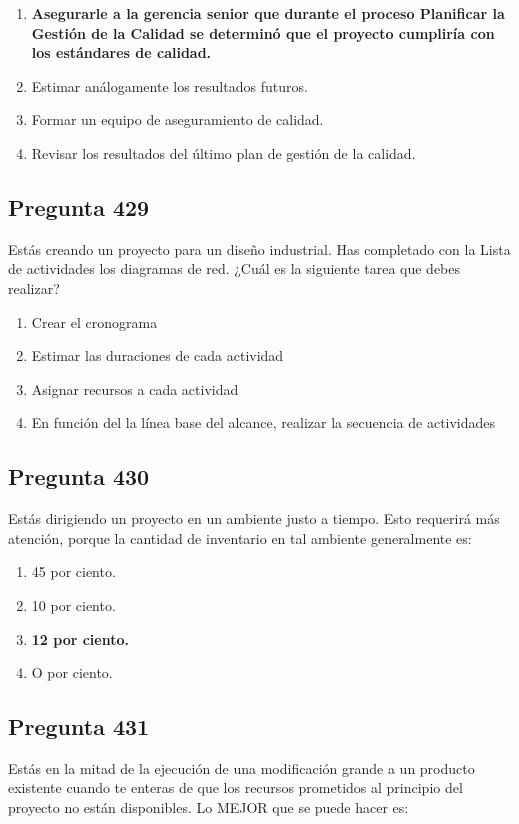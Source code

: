 \documentclass[11pt,a4paper]{article}
\begin{document}
\begin{enumerate}[label=\alph*)]
  \item \textbf{Asegurarle a la gerencia senior que durante el proceso Planificar la Gestión de la Calidad se determinó que el proyecto cumpliría con los estándares de calidad.}
  \item Estimar análogamente los resultados futuros.
  \item Formar un equipo de aseguramiento de calidad.
  \item Revisar los resultados del último plan de gestión de la calidad.
\end{enumerate}

\subsection*{Pregunta 429}
Estás creando un proyecto para un diseño industrial. Has completado con la Lista de actividades los diagramas de red. ¿Cuál es la siguiente tarea que debes realizar?

\begin{enumerate}[label=\alph*)]
  \item Crear el cronograma
  \item Estimar las duraciones de cada actividad
  \item Asignar recursos a cada actividad
  \item En función del la línea base del alcance, realizar la secuencia de actividades
\end{enumerate}

\subsection*{Pregunta 430}
Estás dirigiendo un proyecto en un ambiente justo a tiempo. Esto requerirá más atención, porque la cantidad de inventario en tal ambiente generalmente es:

\begin{enumerate}[label=\alph*)]
  \item 45 por ciento.
  \item 10 por ciento.
  \item \textbf{12 por ciento.}
  \item O por ciento.
\end{enumerate}

\subsection*{Pregunta 431}
Estás en la mitad de la ejecución de una modificación grande a un producto existente cuando te enteras de que los recursos prometidos al principio del proyecto no están disponibles. Lo MEJOR que se puede hacer es:
\end{document}
